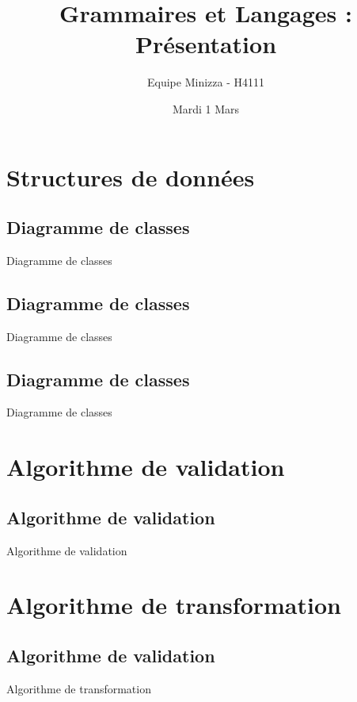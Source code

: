 \documentclass[aspectratio=169]{beamer}
\title[GetL_Presentation]{Grammaires et Langages : Présentation}
\author{Equipe Minizza - H4111}
\institute{INSA de Lyon}
\date{Mardi 1 Mars}
\begin{document}
\begin{frame}
\titlepage
\end{frame}

%


\section{Structures de données}
\subsection{Diagramme de classes}
\begin{frame}{Diagramme de classes}
 
\end{frame}

\subsection{Diagramme de classes}
\begin{frame}{Diagramme de classes}
 
\end{frame}

\subsection{Diagramme de classes}
\begin{frame}{Diagramme de classes}
 
\end{frame}

\section{Algorithme de  validation}
\subsection{Algorithme de  validation}
\begin{frame}{Algorithme de validation}
 
\end{frame}

\section{Algorithme de transformation}
\subsection{Algorithme de  validation}
\begin{frame}{Algorithme de transformation}
 
\end{frame}
\end{document}

